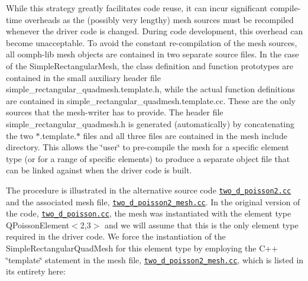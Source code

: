While this strategy greatly facilitates code reuse, it can incur significant compile-\/time overheads as the (possibly very lengthy) mesh sources must be recompiled whenever the driver code is changed. During code development, this overhead can become unacceptable. To avoid the constant re-\/compilation of the mesh sources, all {\ttfamily oomph-\/lib} mesh objects are contained in two separate source files. In the case of the {\ttfamily Simple\+Rectangular\+Mesh}, the class definition and function prototypes are contained in the small auxiliary header file {\ttfamily simple\+\_\+rectangular\+\_\+quadmesh.\+template.\+h}, while the actual function definitions are contained in {\ttfamily simple\+\_\+rectangular\+\_\+quadmesh.\+template.\+cc}. These are the only sources that the mesh-\/writer has to provide. The header file {\ttfamily simple\+\_\+rectangular\+\_\+quadmesh.\+h} is generated (automatically) by concatenating the two $\ast$.template.$\ast$ files and all three files are contained in the mesh include directory. This allows the \char`\"{}user\char`\"{} to pre-\/compile the mesh for a specific element type (or for a range of specific elements) to produce a separate object file that can be linked against when the driver code is built.

The procedure is illustrated in the alternative source code \href{../../../../demo_drivers/poisson/two_d_poisson/two_d_poisson2.cc}{\tt two\+\_\+d\+\_\+poisson2.\+cc} and the associated mesh file, \href{../../../../demo_drivers/poisson/two_d_poisson/two_d_poisson2_mesh.cc}{\tt two\+\_\+d\+\_\+poisson2\+\_\+mesh.\+cc}. In the original version of the code, \href{../../../../demo_drivers/poisson/two_d_poisson/two_d_poisson.cc}{\tt two\+\_\+d\+\_\+poisson.\+cc}, the mesh was instantiated with the element type {\ttfamily Q\+Poisson\+Element$<$2,3$>$} and we will assume that this is the only element type required in the driver code. We force the instantiation of the {\ttfamily Simple\+Rectangular\+Quad\+Mesh} for this element type by employing the C++ \char`\"{}template\char`\"{} statement in the mesh file, \href{../../../../demo_drivers/poisson/two_d_poisson/two_d_poisson2_mesh.cc}{\tt two\+\_\+d\+\_\+poisson2\+\_\+mesh.\+cc}, which is listed in its entirety here\+:


